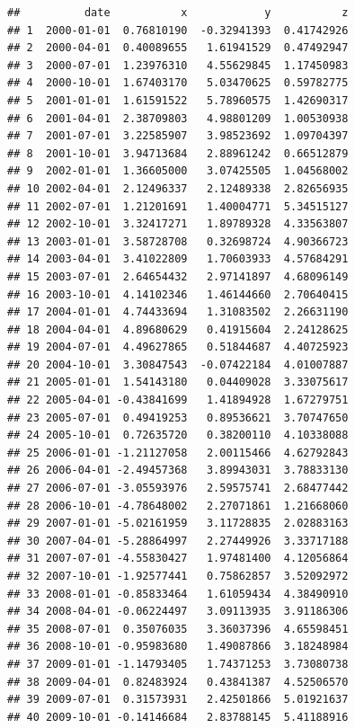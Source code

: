 \documentclass[
]{article}
\newenvironment{Shaded}{\begin{snugshade}}{\end{snugshade}}
\newcommand{\NormalTok}[1]{#1}
\newcommand{\SpecialCharTok}[1]{\textcolor[rgb]{0.00,0.00,0.00}{#1}}
\begin{document}
\begin{Shaded}
\end{Shaded}

\begin{verbatim}
##          date           x            y           z
## 1  2000-01-01  0.76810190  -0.32941393  0.41742926
## 2  2000-04-01  0.40089655   1.61941529  0.47492947
## 3  2000-07-01  1.23976310   4.55629845  1.17450983
## 4  2000-10-01  1.67403170   5.03470625  0.59782775
## 5  2001-01-01  1.61591522   5.78960575  1.42690317
## 6  2001-04-01  2.38709803   4.98801209  1.00530938
## 7  2001-07-01  3.22585907   3.98523692  1.09704397
## 8  2001-10-01  3.94713684   2.88961242  0.66512879
## 9  2002-01-01  1.36605000   3.07425505  1.04568002
## 10 2002-04-01  2.12496337   2.12489338  2.82656935
## 11 2002-07-01  1.21201691   1.40004771  5.34515127
## 12 2002-10-01  3.32417271   1.89789328  4.33563807
## 13 2003-01-01  3.58728708   0.32698724  4.90366723
## 14 2003-04-01  3.41022809   1.70603933  4.57684291
## 15 2003-07-01  2.64654432   2.97141897  4.68096149
## 16 2003-10-01  4.14102346   1.46144660  2.70640415
## 17 2004-01-01  4.74433694   1.31083502  2.26631190
## 18 2004-04-01  4.89680629   0.41915604  2.24128625
## 19 2004-07-01  4.49627865   0.51844687  4.40725923
## 20 2004-10-01  3.30847543  -0.07422184  4.01007887
## 21 2005-01-01  1.54143180   0.04409028  3.33075617
## 22 2005-04-01 -0.43841699   1.41894928  1.67279751
## 23 2005-07-01  0.49419253   0.89536621  3.70747650
## 24 2005-10-01  0.72635720   0.38200110  4.10338088
## 25 2006-01-01 -1.21127058   2.00115466  4.62792843
## 26 2006-04-01 -2.49457368   3.89943031  3.78833130
## 27 2006-07-01 -3.05593976   2.59575741  2.68477442
## 28 2006-10-01 -4.78648002   2.27071861  1.21668060
## 29 2007-01-01 -5.02161959   3.11728835  2.02883163
## 30 2007-04-01 -5.28864997   2.27449926  3.33717188
## 31 2007-07-01 -4.55830427   1.97481400  4.12056864
## 32 2007-10-01 -1.92577441   0.75862857  3.52092972
## 33 2008-01-01 -0.85833464   1.61059434  4.38490910
## 34 2008-04-01 -0.06224497   3.09113935  3.91186306
## 35 2008-07-01  0.35076035   3.36037396  4.65598451
## 36 2008-10-01 -0.95983680   1.49087866  3.18248984
## 37 2009-01-01 -1.14793405   1.74371253  3.73080738
## 38 2009-04-01  0.82483924   0.43841387  4.52506570
## 39 2009-07-01  0.31573931   2.42501866  5.01921637
## 40 2009-10-01 -0.14146684   2.83788145  5.41188916

\end{verbatim}
\end{document}
